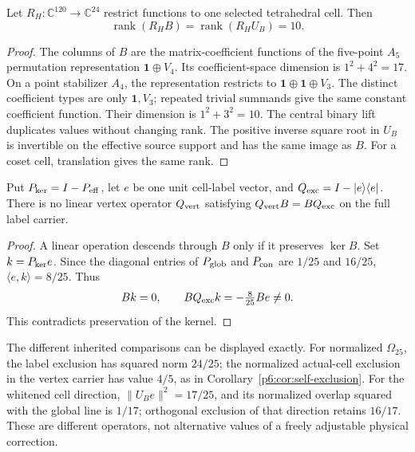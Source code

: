 \documentclass[11pt,a4paper]{article}
\begin{document}
\begin{proposition}
\label{p6:prop:v179-incidence-restriction-rank}
Let \(R_H:\mathbb C^{120}\to\mathbb C^{24}\) restrict functions to one
selected tetrahedral cell.  Then
\[
 \operatorname{rank}(R_H B)=\operatorname{rank}(R_HU_B)=10 .
\]
\end{proposition}
\begin{proof}
The columns of \(B\) are the matrix-coefficient functions of the
five-point \(A_5\) permutation representation \(\mathbf1\oplus V_4\).
Its coefficient-space dimension is \(1^2+4^2=17\).  On a point
stabilizer \(A_4\), the representation restricts to
\(\mathbf1\oplus\mathbf1\oplus V_3\).  The distinct coefficient types
are only \(\mathbf1,V_3\); repeated trivial summands give the same
constant coefficient function.  Their dimension is \(1^2+3^2=10\).
The central binary lift duplicates values without changing rank.
The positive inverse square root in \(U_B\) is invertible on the
effective source support and has the same image as \(B\).
For a coset cell, translation gives the same rank.
\end{proof}

\begin{proposition}
\label{p6:prop:v179-label-exclusion-nondescent}
Put \(P_{\rm ker}=I-P_{\rm eff}\), let \(e\) be one unit cell-label
vector, and \(Q_{\rm exc}=I-|e\rangle\langle e|\).
There is no linear vertex operator \(Q_{\rm vert}\) satisfying
\(Q_{\rm vert}B=BQ_{\rm exc}\) on the full label carrier.
\end{proposition}
\begin{proof}
A linear operation descends through \(B\) only if it preserves
\(\ker B\).  Set \(k=P_{\rm ker}e\).  Since the diagonal entries of
\(P_{\rm glob}\) and \(P_{\rm con}\) are \(1/25\) and \(16/25\),
\(\langle e,k\rangle=8/25\).  Thus
\[
 Bk=0,\qquad BQ_{\rm exc}k=-\tfrac8{25}Be\ne0 .
\]
This contradicts preservation of the kernel.
\end{proof}

The different inherited comparisons can be displayed exactly.
For normalized \(\Omega_{25}\), the label exclusion has squared norm
\(24/25\); the normalized actual-cell exclusion in the vertex carrier
has value \(4/5\), as in Corollary~\ref{p6:cor:self-exclusion}.
For the whitened cell direction,
\(\|U_Be\|^2=17/25\), and its normalized overlap squared with the global
line is \(1/17\); orthogonal exclusion of that direction retains \(16/17\).
These are different operators, not alternative values of a freely
adjustable physical correction.
\end{document}
